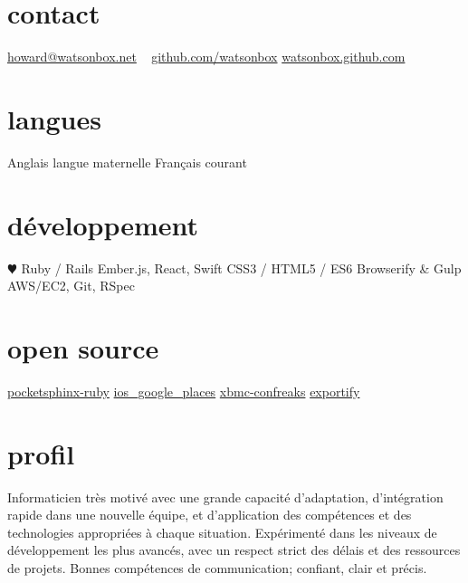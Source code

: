 \documentclass[]{friggeri-cv} %
\begin{document}


\begin{aside} %
\section{contact}
\href{mailto:howard@watsonbox.net}{howard@watsonbox.net}
~
\href{http://github.com/watsonbox}{github.com/watsonbox}
\href{http://watsonbox.github.com}{watsonbox.github.com}
\section{langues}
Anglais langue maternelle
Français courant
\section{développement}
{\color{red} $\varheartsuit$} Ruby / Rails
Ember.js, React, Swift
CSS3 / HTML5 / ES6
Browserify \& Gulp
AWS/EC2, Git, RSpec
\section{open source}
\href{https://github.com/watsonbox/pocketsphinx-ruby}{pocketsphinx-ruby}
\href{https://github.com/watsonbox/ios_google_places_autocomplete}{ios\_google\_places}
\href{https://github.com/watsonbox/xbmc-confreaks}{xbmc-confreaks}
\href{https://github.com/watsonbox/exportify}{exportify}
\end{aside}


\section{profil}

Informaticien très motivé avec une grande capacité d'adaptation, d'intégration rapide dans une nouvelle équipe, et d'application des compétences et des technologies appropriées à chaque situation. Expérimenté dans les niveaux de développement les plus avancés, avec un respect strict des délais et des ressources de projets. Bonnes compétences de communication; confiant, clair et précis.
\end{document}
